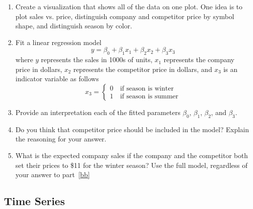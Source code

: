 \begin{enumerate}
\begin{enumerate}
\item Create a visualization that shows all of the data on one plot.
  One idea is to plot sales vs. price, distinguish company and competitor
  price by symbol shape, and distinguish season by color.
  \item Fit a linear regression model 
\[
y = \beta_0 + \beta_1x_1 + \beta_2x_2 + \beta_3x_3
\]
where $y$ represents the sales in 1000s of units, $x_1$ represents
the company price in dollars, $x_2$ represents the competitor price in
dollars, and $x_3$ is an indicator variable as follows
\[
x_3 = \begin{cases} 0 \quad \text{if season is winter} \\
1 \quad \text{if season is summer}
\end{cases}
\]
\item Provide an interpretation each of the fitted parameters $\beta_0$, $\beta_1$,
  $\beta_2$, and $\beta_3$. \label{aa}
\item Do you think that competitor price should be included in the
  model?  Explain the reasoning for your answer. \label{bb}
\item What is the expected company sales if the company and the
  competitor both set their prices to \$11 for the winter season?  Use
  the full model, regardless of your answer to
  part~\ref{bb} \label{cc}
\end{enumerate}

\subsection*{Time Series}
  
\end{enumerate}
